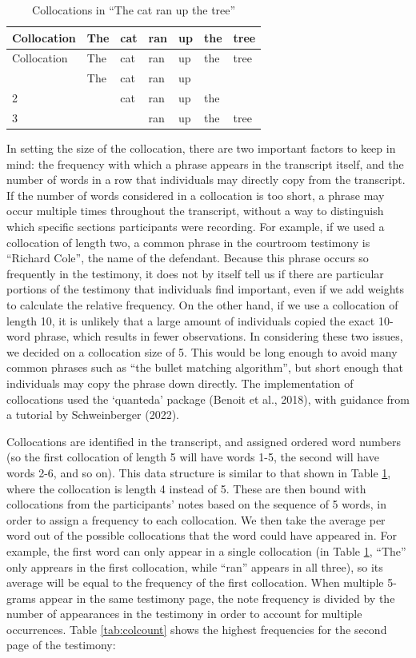 \documentclass[print]{nuthesis}
\begin{document}
\begin{longtable}[]{@{}lllllll@{}}
\caption{Collocations in ``The cat ran up the tree'' \label{tab:colex}}\tabularnewline
\toprule\noalign{}
Collocation & The & cat & ran & up & the & tree \\
\midrule\noalign{}
\endfirsthead
\toprule\noalign{}
Collocation & The & cat & ran & up & the & tree \\
\midrule\noalign{}
\endhead
\bottomrule\noalign{}
\endlastfoot
1 & The & cat & ran & up & & \\
2 & & cat & ran & up & the & \\
3 & & & ran & up & the & tree \\
\end{longtable}

In setting the size of the collocation, there are two important factors to keep in mind: the frequency with which a phrase appears in the transcript itself, and the number of words in a row that individuals may directly copy from the transcript.
If the number of words considered in a collocation is too short, a phrase may occur multiple times throughout the transcript, without a way to distinguish which specific sections participants were recording.
For example, if we used a collocation of length two, a common phrase in the courtroom testimony is ``Richard Cole'', the name of the defendant.
Because this phrase occurs so frequently in the testimony, it does not by itself tell us if there are particular portions of the testimony that individuals find important, even if we add weights to calculate the relative frequency.
On the other hand, if we use a collocation of length 10, it is unlikely that a large amount of individuals copied the exact 10-word phrase, which results in fewer observations.
In considering these two issues, we decided on a collocation size of 5.
This would be long enough to avoid many common phrases such as ``the bullet matching algorithm'', but short enough that individuals may copy the phrase down directly.
The implementation of collocations used the `quanteda' package (Benoit et al., 2018), with guidance from a tutorial by Schweinberger (2022).

Collocations are identified in the transcript, and assigned ordered word numbers (so the first collocation of length 5 will have words 1-5, the second will have words 2-6, and so on).
This data structure is similar to that shown in Table \ref{tab:colex}, where the collocation is length 4 instead of 5.
These are then bound with collocations from the participants' notes based on the sequence of 5 words, in order to assign a frequency to each collocation.
We then take the average per word out of the possible collocations that the word could have appeared in.
For example, the first word can only appear in a single collocation (in Table \ref{tab:colex}, ``The'' only apprears in the first collocation, while ``ran'' appears in all three), so its average will be equal to the frequency of the first collocation.
When multiple 5-grams appear in the same testimony page, the note frequency is divided by the number of appearances in the testimony in order to account for multiple occurrences.
Table \ref{tab:colcount} shows the highest frequencies for the second page of the testimony:
\end{document}
